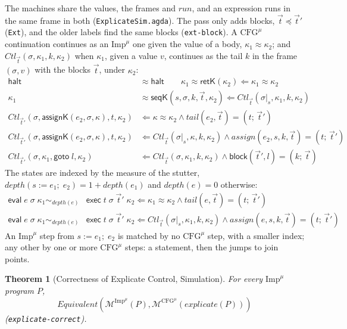 \documentclass[10pt]{article}
\theoremstyle{acmplain}
\newtheorem{theorem}{Theorem}[section]
\newcommand{\key}[1]{\mathsf{#1}}
\newcommand{\pass}[1]{\mathit{#1}}
\newcommand{\Mach}[1]{\mathcal{M}^{#1}}
\newcommand{\Equiv}{\mathit{Equivalent}}
\newcommand{\Kf}[2]{\key{#1}(#2)}
\newcommand{\halt}{\key{halt}}
\newcommand{\assign}[3]{#1 \mathrel{:=} #2;\; #3}
\newcommand{\evi}[3]{\key{eval}\;#1\;#2\;#3}
\newcommand{\exc}[4]{\key{exec}\;#1\;#2\;#3\;#4}
\newcommand{\Tgoto}[1]{\key{goto}\;#1}
\newcommand{\Tcut}[2]{#1|_{#2}}                %
\newcommand{\Ml}[1]{\textrm{#1}^{\mu}}                  %
\begin{document}
The machines share the values, the frames and $\mathit{run}$, and an
expression runs in the same frame in both (\texttt{ExplicateSim.agda}).
The pass only adds blocks, $\vec{t} \preceq \vec{t}'$ (\texttt{Ext}), and the
older labels find the same blocks (\texttt{ext-block}). A $\Ml{CFG}$
continuation continues as an $\Ml{Imp}$ one given the value of a body,
$\kappa_1 \approx \kappa_2$; and
$\mathit{Ctl}_{\vec{t}}(\sigma, \kappa_1, k, \kappa_2)$ when $\kappa_1$,
given a value $v$, continues as the tail $k$ in the frame $(\sigma, v)$
with the blocks $\vec{t}$, under $\kappa_2$:
\begin{align*}
  \halt &\approx \halt \qquad
  \kappa_1 \approx \Kf{retK}{\kappa_2} \Leftarrow \kappa_1 \approx \kappa_2 \\
  \kappa_1 &\approx \Kf{seqK}{s, \sigma, k, \vec{t}, \kappa_2} \Leftarrow
    \mathit{Ctl}_{\vec{t}}(\Tcut{\sigma}{s}, \kappa_1, k, \kappa_2) \\[1ex]
  \mathit{Ctl}_{\vec{t}'}(\sigma, \Kf{assignK}{e_2, \sigma, \kappa}, t, \kappa_2) &\Leftarrow
    \kappa \approx \kappa_2 \land \pass{tail}(e_2, \vec{t}) = (t;\, \vec{t}') \\
  \mathit{Ctl}_{\vec{t}'}(\sigma, \Kf{assignK}{e_2, \sigma, \kappa}, t, \kappa_2) &\Leftarrow
    \mathit{Ctl}_{\vec{t}}(\Tcut{\sigma}{s}, \kappa, k, \kappa_2) \land
    \pass{assign}(e_2, s, k, \vec{t}) = (t;\, \vec{t}') \\
  \mathit{Ctl}_{\vec{t}'}(\sigma, \kappa_1, \Tgoto{l}, \kappa_2) &\Leftarrow
    \mathit{Ctl}_{\vec{t}}(\sigma, \kappa_1, k, \kappa_2) \land \key{block}(\vec{t}', l) = (k;\, \vec{t})
\end{align*}
The states are indexed by the measure of the stutter,
$\mathit{depth}(\assign{s}{e_1}{e_2}) = 1 + \mathit{depth}(e_1)$ and
$\mathit{depth}(e) = 0$ otherwise:
\begin{align*}
  \evi{e}{\sigma}{\kappa_1} \sim_{\mathit{depth}(e)} {}& \exc{t}{\sigma}{\vec{t}'}{\kappa_2}
    \Leftarrow \kappa_1 \approx \kappa_2 \land \pass{tail}(e, \vec{t}) = (t;\, \vec{t}') \\
  \evi{e}{\sigma}{\kappa_1} \sim_{\mathit{depth}(e)} {}& \exc{t}{\sigma}{\vec{t}'}{\kappa_2}
    \Leftarrow \mathit{Ctl}_{\vec{t}}(\Tcut{\sigma}{s}, \kappa_1, k, \kappa_2) \land
      \pass{assign}(e, s, k, \vec{t}) = (t;\, \vec{t}')
\end{align*}
An $\Ml{Imp}$ step from $\assign{s}{e_1}{e_2}$ is matched by no $\Ml{CFG}$
step, with a smaller index; any other by one or more $\Ml{CFG}$ steps: a
statement, then the jumps to join points.
\begin{theorem}[Correctness of Explicate Control, Simulation]\label{thm:m-cek-explicate}
For every $\Ml{Imp}$ program $P$,
\[ \Equiv(\Mach{\Ml{Imp}}(P), \Mach{\Ml{CFG}}(\pass{explicate}(P))) \]
(\texttt{explicate-correct}).
\end{theorem}
\end{document}
